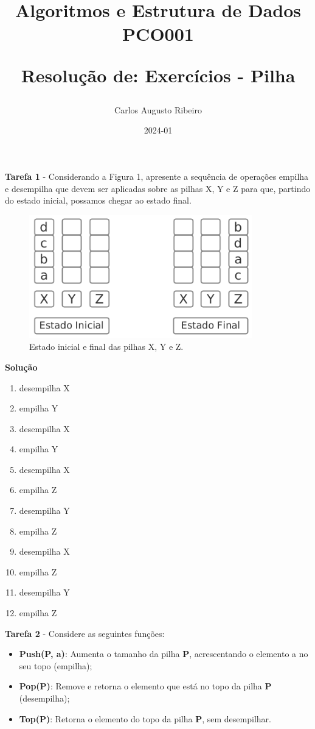 \documentclass{article}
\title{
Algoritmos e Estrutura de Dados PCO001

Resolução de: \textbf{Exercícios - Pilha}
}
\author{Carlos Augusto Ribeiro}
\date{2024-01}
\begin{document}
\maketitle

\par
\noindent
\textbf{Tarefa 1} - Considerando a Figura 1, apresente a sequência de operações empilha e desempilha que devem ser aplicadas sobre as pilhas X, Y e Z para que, partindo do estado inicial, possamos chegar ao estado final.

\begin{figure}[h!]
    \clearpage
    \centering
    \includegraphics[width=0.5\linewidth]{pilha/1.PNG}
    \caption{Estado inicial e final das pilhas X, Y e Z.
}
\end{figure}

\par
\noindent
\textbf{Solução}
\begin{multicols}{2}
\color{red}
\begin{enumerate}
    \item desempilha X
    \item empilha Y
    \item desempilha X
    \item empilha Y
    \item desempilha X
    \item empilha Z
    \item desempilha Y
    \item empilha Z
    \item desempilha X
    \item empilha Z
    \item desempilha Y
    \item empilha Z
\end{enumerate}
\end{multicols}

\bigskip

\par
\noindent
\textbf{Tarefa 2} - Considere as seguintes funções:
\begin{itemize}
    \item \textbf{Push(P, a)}: Aumenta o tamanho da pilha \textbf{P}, acrescentando o elemento a no seu topo (empilha);
    \item \textbf{Pop(P)}: Remove e retorna o elemento que está no topo da pilha \textbf{P} (desempilha);
    \item \textbf{Top(P)}: Retorna o elemento do topo da pilha \textbf{P}, sem desempilhar.
\end{itemize}
\end{document}
